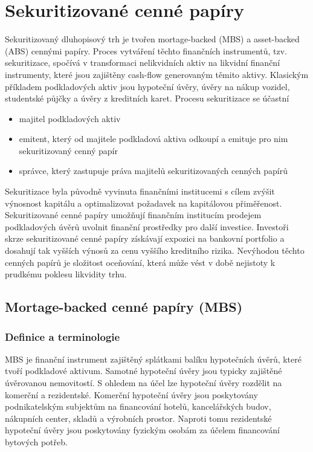 \documentclass[a4paper]{book}
\begin{document}
\chapter{Sekuritizované cenné papíry}

Sekuritizovaný dluhopisový trh je tvořen mortage-backed (MBS) a asset-backed (ABS) cennými papíry. Proces vytváření těchto finančních instrumentů, tzv. sekuritizace, spočívá v transformaci nelikvidních aktiv na likvidní finanční instrumenty, které jsou zajištěny cash-flow generovaným těmito aktivy. Klasickým příkladem podkladových aktiv jsou hypoteční úvěry, úvěry na nákup vozidel, studentské půjčky a úvěry z kreditních karet. Procesu sekuritizace se účastní
\begin{itemize}
\item majitel podkladových aktiv
\item emitent, který od majitele podkladová aktiva odkoupí a emituje pro nim sekuritizovaný cenný papír
\item správce, který zastupuje práva majitelů sekuritizovaných cenných papírů
\end{itemize}

Sekuritizace byla původně vyvinuta finančními institucemi s cílem zvýšit výnosnost kapitálu a optimalizovat požadavek na kapitálovou přiměřenost. Sekuritizované cenné papíry umožňují finančním institucím prodejem podkladových úvěrů uvolnit finanční prostředky pro další investice. Investoři skrze sekuritizované cenné papíry získávají expozici na bankovní portfolio a dosahují tak vyšších výnosů za cenu vyššího kreditního rizika. Nevýhodou těchto cenných papírů je složitost oceňování, která může vést v době nejistoty k prudkému poklesu likvidity trhu.

\section{Mortage-backed cenné papíry (MBS)}

\subsection{Definice a terminologie}

MBS je finanční instrument zajištěný splátkami balíku hypotečních úvěrů, které tvoří podkladové aktivum. Samotné hypoteční úvěry jsou typicky zajištěné úvěrovanou nemovitostí. S ohledem na účel lze hypoteční úvěry rozdělit na komerční a rezidentské. Komerční hypoteční úvěry jsou poskytovány podnikatelským subjektům na financování hotelů, kancelářských budov, nákupních center, skladů a výrobních prostor. Naproti tomu rezidentské hypoteční úvěry jsou poskytovány fyzickým osobám za účelem financování bytových potřeb.
\end{document}
